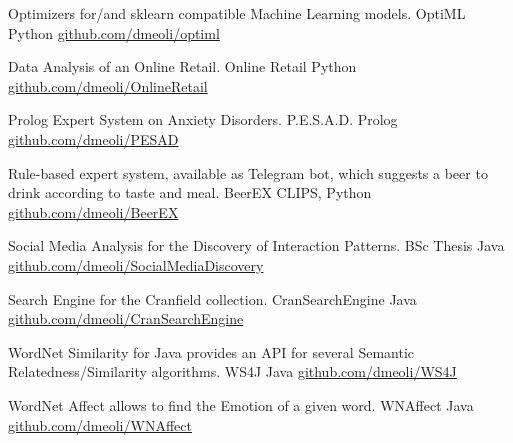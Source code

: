 

\begin{cventries}

  \cventry
    {Optimizers for/and sklearn compatible Machine Learning models.} %
    {OptiML} %
    {Python} %
    {\href{https://github.com/dmeoli/optiml}{github.com/dmeoli/optiml}} %
    {}
    
  \cventry
    {Data Analysis of an Online Retail.} %
    {Online Retail} %
    {Python} %
    {\href{https://github.com/dmeoli/OnlineRetail}{github.com/dmeoli/OnlineRetail}} %
    {}

  \cventry
    {Prolog Expert System on Anxiety Disorders.} %
    {P.E.S.A.D.} %
    {Prolog} %
    {\href{https://github.com/dmeoli/PESAD}{github.com/dmeoli/PESAD}} %
    {}

  \cventry
    {Rule-based expert system, available as Telegram bot, which suggests a beer to drink according to taste and meal.} %
    {BeerEX} %
    {CLIPS, Python} %
    {\href{https://github.com/dmeoli/BeerEX}{github.com/dmeoli/BeerEX}} %
    {}

  \cventry
    {Social Media Analysis for the Discovery of Interaction Patterns.} %
    {BSc Thesis} %
    {Java} %
    {\href{https://github.com/dmeoli/SocialMediaDiscovery}{github.com/dmeoli/SocialMediaDiscovery}} %
    {}

  \cventry
    {Search Engine for the Cranfield collection.} %
    {CranSearchEngine} %
    {Java} %
    {\href{https://github.com/dmeoli/CranSearchEngine}{github.com/dmeoli/CranSearchEngine}} %
    {}

  \cventry
    {WordNet Similarity for Java provides an API for several Semantic Relatedness/Similarity algorithms.} %
    {WS4J} %
    {Java} %
    {\href{https://github.com/dmeoli/WS4J}{github.com/dmeoli/WS4J}} %
    {}

  \cventry
    {WordNet Affect allows to find the Emotion of a given word.} %
    {WNAffect} %
    {Java} %
    {\href{https://github.com/dmeoli/WNAffect}{github.com/dmeoli/WNAffect}} %
    {}

\end{cventries}
